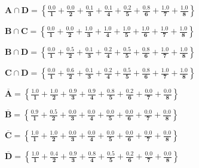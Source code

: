 \documentclass{article}
\begin{document}
\begin{enumerate}
        $\boldsymbol{A \cap D =
            \left\{
            \frac{0.0}{1} +
            \frac{0.0}{2} +
            \frac{0.1}{3} +
            \frac{0.1}{4} +
            \frac{0.2}{5} +
            \frac{0.8}{6} +
            \frac{1.0}{7} +
            \frac{1.0}{8}
            \right\}}$

        $\boldsymbol{B \cap C =
            \left\{
            \frac{0.0}{1} +
            \frac{0.0}{2} +
            \frac{1.0}{3} +
            \frac{1.0}{4} +
            \frac{1.0}{5} +
            \frac{1.0}{6} +
            \frac{1.0}{7} +
            \frac{1.0}{8}
            \right\}}$

        $\boldsymbol{B \cap D =
            \left\{
            \frac{0.0}{1} +
            \frac{0.5}{2} +
            \frac{0.1}{3} +
            \frac{0.2}{4} +
            \frac{0.5}{5} +
            \frac{0.8}{6} +
            \frac{1.0}{7} +
            \frac{1.0}{8}
            \right\}}$

        $\boldsymbol{C \cap D =
            \left\{
            \frac{0.0}{1} +
            \frac{0.6}{2} +
            \frac{0.1}{3} +
            \frac{0.2}{4} +
            \frac{0.5}{5} +
            \frac{0.8}{6} +
            \frac{1.0}{7} +
            \frac{1.0}{8}
            \right\}}$

        $\boldsymbol{\overline{A} =
            \left\{
            \frac{1.0}{1} +
            \frac{1.0}{2} +
            \frac{0.9}{3} +
            \frac{0.9}{4} +
            \frac{0.8}{5} +
            \frac{0.2}{6} +
            \frac{0.0}{7} +
            \frac{0.0}{8}
            \right\}}$

        $\boldsymbol{\overline{B} =
            \left\{
            \frac{0.9}{1} +
            \frac{0.5}{2} +
            \frac{0.0}{3} +
            \frac{0.0}{4} +
            \frac{0.0}{5} +
            \frac{0.0}{6} +
            \frac{0.0}{7} +
            \frac{0.0}{8}
            \right\}}$

        $\boldsymbol{\overline{C} =
            \left\{
            \frac{1.0}{1} +
            \frac{1.0}{2} +
            \frac{0.0}{3} +
            \frac{0.0}{4} +
            \frac{0.0}{5} +
            \frac{0.0}{6} +
            \frac{0.0}{7} +
            \frac{0.0}{8}
            \right\}}$

        $\boldsymbol{\overline{D} =
            \left\{
            \frac{1.0}{1} +
            \frac{0.4}{2} +
            \frac{0.9}{3} +
            \frac{0.8}{4} +
            \frac{0.5}{5} +
            \frac{0.2}{6} +
            \frac{0.0}{7} +
            \frac{0.0}{8}
            \right\}}$



\end{enumerate}
\end{document}
